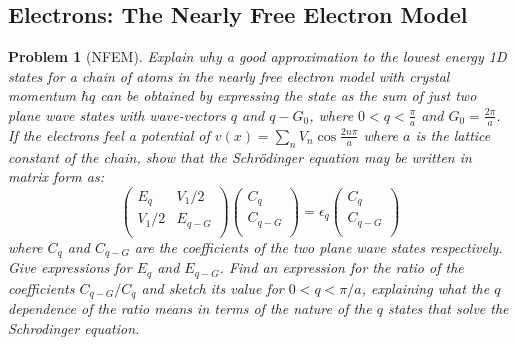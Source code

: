 \documentclass[a4paper]{article}
\theoremstyle{new}
\newtheorem{qns}{Problem}[section]
\begin{document}
\subsection*{Electrons: The Nearly Free Electron Model}
\begin{qns}[NFEM]
Explain why a good approximation to the lowest energy 1D states for a chain of atoms in the nearly free electron model with crystal momentum $\hbar q$ can be obtained by expressing the state as the sum of just two plane wave states with wave-vectors $q$ and $q-G_0$, where $0<q<\frac{\pi}{a}$ and $G_0=\frac{2\pi}{a}$. If the electrons feel a potential of $v(x)=\sum_nV_n\cos\frac{2n\pi}{a}$ where $a$ is the lattice constant of the chain, show that the Schr\"{o}dinger equation may be written in matrix form as:
$$\begin{pmatrix}E_q&V_1/2\\V_1/2&E_{q-G}\\\end{pmatrix}\begin{pmatrix}C_q\\C_{q-G}\\\end{pmatrix}=\epsilon_q\begin{pmatrix}C_q\\C_{q-G}\\\end{pmatrix}$$
where $C_q$ and $C_{q-G}$ are the coefficients of the two plane wave states respectively. Give expressions for $E_q$ and $E_{q-G}$. Find an expression for the ratio of the coefficients $C_{q- G}/C_q$ and sketch its value for $0<q<\pi/a$, explaining what the $q$ dependence of the ratio means in terms of the nature of the $q$ states that solve the Schrodinger equation.
\end{qns}
\end{document}
